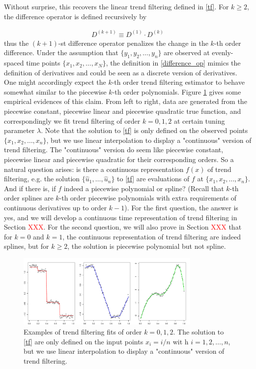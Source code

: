 \documentclass[a4paper]{article}
\begin{document}
Without surprise, this recovers the linear trend filtering defined in \eqref{tf}. For $k\geq 2$, the difference operator is defined recursively by 

\begin{align}
D^{(k+1)} \equiv D^{(1)} \cdot D^{(k)} \label{difference_op}
\end{align}
thus the $(k+1)$-st difference operator penalizes the change in the $k$-th order difference. Under the assumption that $\{y_1,y_2,\ldots, y_n\}$ are observed at evenly-spaced time points $\{x_1,x_2,\ldots, x_N\}$, the definition in \eqref{difference_op} mimics the definition of derivatives and could be seen as a discrete version of derivatives. One might accordingly expect the $k$-th order trend filtering estimator to behave somewhat similar to the piecewise $k$-th order polynomials. Figure \ref{fig:Figure1_examples} gives some empirical evidences of this claim. From left to right, data are generated from the piecewise constant, piecewise linear and piecewise quadratic true function, and correspondingly we fit trend filtering of order $k = 0,1,2$ at certain tuning parameter $\lambda$. Note that the solution to \eqref{tf} is only defined on the observed points $\{x_1,x_2, \ldots, x_n\}$, but we use linear interpolation to display a "continuous" version of trend filtering. The "continuous" version do seem like piecewise constant, piecewise linear and piecewise quadratic for their corresponding orders. So a natural question arises: is there a continuous representation $f(x)$ of trend filtering, e.g. the solution $\{\hat{u}_1,\ldots, \hat{u}_n\}$ to \eqref{tf} are evaluations of $f$ at $\{x_1, x_2,\ldots, x_n\}$. And if there is, if $f$ indeed a piecewise polynomial or spline? (Recall that $k$-th order splines are $k$-th order piecewise polynomials with extra requirements of continuous derivatives up to order $k-1$). For the first question, the answer is yes, and we will develop a continuous time representation of trend filtering in Section \textcolor{red}{XXX}. For the second question, we will also prove in Section \textcolor{red}{XXX} that for $k=0$ and $k=1$, the continuous representation of trend filtering are indeed splines, but for $k\geq 2$, the solution is piecewise polynomial but not spline. 

\begin{figure}[t!]
\centering
\includegraphics[width = 0.8\textwidth]{Figures/Figure1.pdf}
\caption{Examples of trend filtering fits of order $k =0, 1, 2$. The solution to \eqref{tf} are only defined on the input points $x_i = i/n$ wit h $i=1,2,\ldots, n$, but we use linear interpolation to display a "continuous" version of trend filtering.}
\label{fig:Figure1_examples}
\end{figure}
\end{document}
